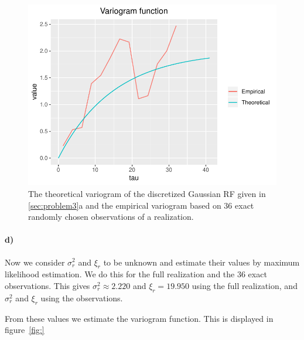 \begin{figure}
    \centering
    \includegraphics[scale=0.95]{figures/3c_variogram_obs.pdf}
    \caption{The theoretical variogram of the discretized Gaussian RF given in \ref{sec:problem3}a and the empirical variogram based on 36 exact randomly chosen observations of a realization.}
    \label{fig:3c_variogram_obs}
\end{figure}

\paragraph{d)}
Now we consider $\sigma_r^2$ and $\xi_r$ to be unknown and estimate their values by maximum likelihood estimation. We do this for the full realization and the 36 exact observations. This gives $\sigma_r^2 \approx 2.220$ and $\xi_r = 19.950$ using the full realization, and $\sigma_r^2$ and $\xi_r$ using the observations. 

From these values we estimate the variogram function. This is displayed in figure~\ref{fig:}

